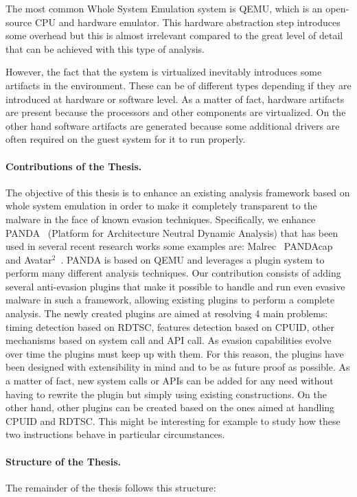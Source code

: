 The most common Whole System Emulation system is QEMU, which is an open-source CPU and hardware emulator. This hardware abstraction step introduces some overhead but this is almost irrelevant compared to the great level of detail that can be achieved with this type of analysis. 

However, the fact that the system is virtualized inevitably introduces some artifacts in the environment. These can be of different types depending if they are introduced at hardware or software level. As a matter of fact, hardware artifacts are present because the processors and other components are virtualized. On the other hand software artifacts are generated because some additional drivers are often required on the guest system for it to run properly. 

\paragraph{Contributions of the Thesis.}
The objective of this thesis is to enhance an existing analysis framework based on whole system emulation in order to make it completely transparent to the malware in the face of known evasion techniques. Specifically, we enhance PANDA~\cite{panda} (Platform for Architecture Neutral Dynamic Analysis) that has been used in several recent research works some examples are: Malrec~\cite{malrec} PANDAcap~\cite{pandacap} and Avatar$^2$~\cite{avatar2}. PANDA is based on QEMU and leverages a plugin system to perform many different analysis techniques. Our contribution consists of adding several anti-evasion plugins that make it possible to handle and run even evasive malware in such a framework, allowing existing plugins to perform a complete analysis. The newly created plugins are aimed at resolving 4 main problems: timing detection based on RDTSC, features detection based on CPUID, other mechanisms based on system call and API call. As evasion capabilities evolve over time the plugins must keep up with them. For this reason, the plugins have been designed with extensibility in mind and to be as future proof as possible. As a matter of fact, new system calls or APIs can be added for any need without having to rewrite the plugin but simply using existing constructions. On the other hand, other plugins can be created based on the ones aimed at handling CPUID and RDTSC. This might be interesting for example to study how these two instructions behave in particular circumstances.


\medskip
\paragraph{Structure of the Thesis.} The remainder of the thesis follows this structure:

